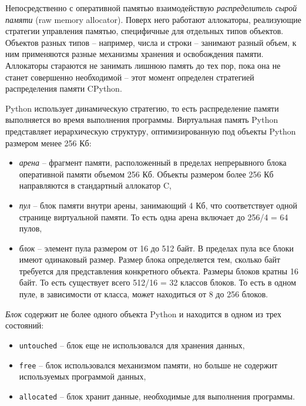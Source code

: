 \documentclass[%
	11pt,
	a4paper,
	utf8,
		]{article}
\begin{document}
Непосредственно с оперативной памятью взаимодействую \emph{распределитель сырой памяти} (raw memory allocator). Поверх него работают аллокаторы, реализующие стратегии управления памятью, специфичные для отдельных типов объектов. Объектов разных типов -- например, числа и строки -- занимают разный объем, к ним применяются разные механизмы хранения и освобождения памяти. Аллокаторы стараются не занимать лишнюю память до тех пор, пока она не станет совершенно необходимой -- этот момент определен стратегией распределения памяти CPython.

Python использует динамическую стратегию, то есть распределение памяти выполняется во время выполнения программы. Виртуальная память Python представляет иерархическую структуру, оптимизированную под объекты Python размером менее 256 Кб:
\begin{itemize}
	\item \emph{арена} -- фрагмент памяти, расположенный в пределах непрерывного блока оперативной памяти объемом 256 Кб. Объекты размером более 256 Кб направляются в стандартный аллокатор C,
	
	\item \emph{пул} -- блок памяти внутри арены, занимающий 4 Кб, что соответствует одной странице виртуальной памяти. То есть одна арена включает до 256/4 = 64 пулов,
	
	\item \emph{блок} -- элемент пула размером от 16 до 512 байт. В пределах пула все блоки имеют одинаковый размер. Размер блока определяется тем, сколько байт требуется для представления конкретного объекта. Размеры блоков кратны 16 байт. То есть существует всего 512/16 = 32 классов блоков. То есть в одном пуле, в зависимости от класса, может находиться от 8 до 256 блоков.
\end{itemize}

\emph{Блок} содержит не более одного объекта Python и находится в одном из трех состояний:
\begin{itemize}
	\item \texttt{untouched} -- блок еще не использовался для хранения данных,
	
	\item \texttt{free} -- блок использовался механизмом памяти, но больше не содержит используемых программой данных,
	
	\item \texttt{allocated} -- блок хранит данные, необходимые для выполнения программы.
\end{itemize}
\end{document}

